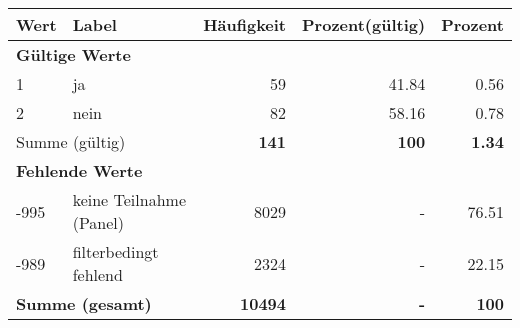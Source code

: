      \begin{longtable}{lXrrr}
     \toprule
     \textbf{Wert} & \textbf{Label} & \textbf{Häufigkeit} & \textbf{Prozent(gültig)} & \textbf{Prozent} \\
     \endhead
     \midrule
     \multicolumn{5}{l}{\textbf{Gültige Werte}}\\

     1 &
     \multicolumn{1}{X}{ ja   } &


       \num{59} &
       \num[round-mode=places,round-precision=2]{41.84} &
         \num[round-mode=places,round-precision=2]{0.56} \\

     2 &
     \multicolumn{1}{X}{ nein   } &


       \num{82} &
       \num[round-mode=places,round-precision=2]{58.16} &
         \num[round-mode=places,round-precision=2]{0.78} \\
     \midrule
     \multicolumn{2}{l}{Summe (gültig)} &
       \textbf{\num{141}} &
     \textbf{\num{100}} &
       \textbf{\num[round-mode=places,round-precision=2]{1.34}} \\
     \multicolumn{5}{l}{\textbf{Fehlende Werte}}\\
       -995 &
       keine Teilnahme (Panel) &
         \num{8029} &
        - &
         \num[round-mode=places,round-precision=2]{76.51} \\
       -989 &
       filterbedingt fehlend &
         \num{2324} &
        - &
         \num[round-mode=places,round-precision=2]{22.15} \\
     \midrule
     \multicolumn{2}{l}{\textbf{Summe (gesamt)}} &
          \textbf{\num{10494}} &
        \textbf{-} &
        \textbf{\num{100}} \\
     \bottomrule
     \end{longtable}
     
